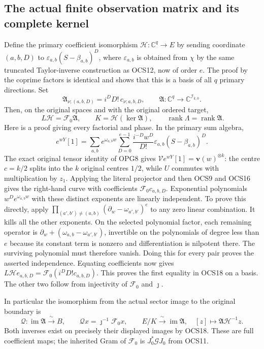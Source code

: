 \documentclass[11pt,a4paper]{article}
\begin{document}
\subsection{The actual finite observation matrix and its complete kernel}
Define the primary coefficient isomorphism
$\mathcal H:\mathbb C^q\to E$ by sending coordinate $(a,b,D)$
to $\varepsilon_{a,b}(S-\beta_{a,b})^D$, where
$\varepsilon_{a,b}$ is obtained from $\chi$ by the same truncated
Taylor-inverse construction as OCS12, now of order $e$.
The proof by the coprime factors is identical and shows that this
is a basis of all $q$ primary directions. Set
\[
 \mathfrak A_{\nu;(a,b,D)}=i^D D!\,c_{\nu;a,b,D},
 \qquad
 \mathfrak A:\mathbb C^q\longrightarrow
                            \mathbb C^{\mathcal I_{k,0}}.
 \tag{OCS17}
\]
Then, on the original spaces and with the original ordered target,
\[
 \boxed{\ L\mathcal H=\mathcal F_0\mathfrak A,\qquad
 K=\mathcal H(\ker\mathfrak A),\qquad
 \operatorname{rank}\Lambda=\operatorname{rank}\mathfrak A. }
 \tag{OCS18}
\]
Here is a proof giving every factorial and phase. In the primary
sum algebra,
\[
 e^{wY}[1]=\sum_{a,b}e^{\omega_{a,b}w}
          \sum_{D=0}^{e-1}\frac{i^{-D}w^D}{D!}
                  \varepsilon_{a,b}(S-\beta_{a,b})^D.
\]
The exact original tensor identity of OPG8 gives
$\mathcal V e^{wY}[1]=\mathbf v(w)^{\otimes k}$: the centre
$c=k/2$ splits into the $k$ original centres $1/2$, while
$U$ commutes with multiplication by $z_1$.
Applying the literal projector and then OCS9 and OCS16 gives
the right-hand curve with coefficients
$\mathcal F_0c_{a,b,D}$.
Exponential polynomials $w^De^{\omega_{a,b}w}$ with these distinct
exponents are linearly independent. To prove this directly,
apply $\prod_{(a',b')\ne(a,b)}(\partial_w-\omega_{a',b'})^e$
to any zero linear combination. It kills all the other exponents.
On the selected polynomial factor, each remaining operator is
$\partial_w+(\omega_{a,b}-\omega_{a',b'})$, invertible on the
polynomials of degree less than $e$ because its constant term
is nonzero and differentiation is nilpotent there. The surviving
polynomial must therefore vanish. Doing this for every pair proves
the asserted independence. Equating coefficients now gives
$L\mathcal H e_{a,b,D}=\mathcal F_0(i^DD!c_{a,b,D})$.
This proves the first equality in OCS18 on a basis. The other
two follow from injectivity of $\mathcal F_0$ and $\jmath$.

In particular the isomorphism from the actual sector image to
the original boundary is
\[
 \mathcal Q:\operatorname{im}\mathfrak A\xrightarrow{\ \sim\ }B,
 \qquad \mathcal Qx=\jmath^{-1}\mathcal F_0x,
 \qquad
 E/K\xrightarrow{\ \sim\ }\operatorname{im}\mathfrak A,
 \quad[z]\longmapsto\mathfrak A\mathcal H^{-1}z.
 \tag{OCS19}
\]
Both inverses exist on precisely their displayed images by OCS18.
These are full coefficient maps; the inherited Gram of
$\mathcal F_0$ is $J_0^*\mathcal GJ_0$ from OCS11.
\end{document}
